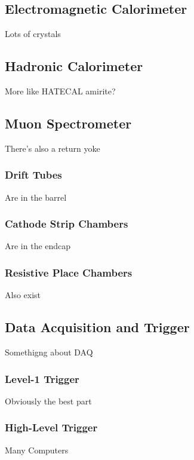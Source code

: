 \subsection{Electromagnetic Calorimeter}
Lots of crystals


\subsection{Hadronic Calorimeter}
More like HATECAL amirite?


\subsection{Muon Spectrometer}
There's also a return yoke

\subsubsection{Drift Tubes}
Are in the barrel

\subsubsection{Cathode Strip Chambers}
Are in the endcap

\subsubsection{Resistive Place Chambers}
Also exist


\subsection{Data Acquisition and Trigger}
Somethigng about DAQ

\subsubsection{Level-1 Trigger}
Obviously the best part

\subsubsection{High-Level Trigger}
Many Computers
